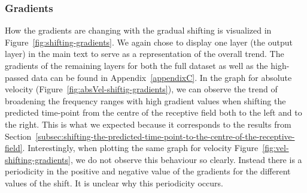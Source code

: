 \subsubsection{Gradients}\label{subsubsec:across-shiftig-gradients}
How the gradients are changing with the gradual shifting is visualized in Figure~\ref{fig:shifting-gradients}. 
We again chose to display one layer (the output layer) in the main text to serve as a representation of the overall trend.
The gradients of the remaining layers for both the full dataset as well as the high-passed data can be found in Appendix~\ref{appendixC}.
In the graph for absolute velocity (Figure~\ref{fig:absVel-shiftig-gradients}), we can observe the trend of broadening the frequency ranges with high gradient values when shifting the predicted time-point from the centre of the receptive field both to the left and to the right.
This is what we expected because it corresponds to the results from Section~\ref{subsec:shifting-the-predicted-time-point-to-the-centre-of-the-receptive-field}.
Interestingly, when plotting the same graph for velocity Figure~\ref{fig:vel-shifting-gradients}, we do not observe this behaviour so clearly.
Instead there is a periodicity in the positive and negative value of the gradients for the different values of the shift.
It is unclear why this periodicity occurs.

